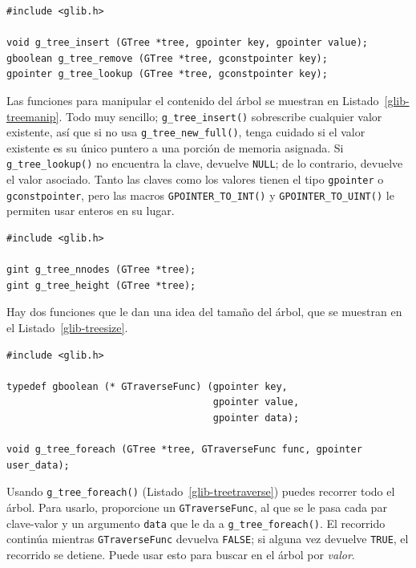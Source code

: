 \begin{lstlisting}[style=GLib/GTK, caption={Manipular el contenido de \lstinline{GTree}}, label=glib-treemanip]
#include <glib.h>

void g_tree_insert (GTree *tree, gpointer key, gpointer value);
gboolean g_tree_remove (GTree *tree, gconstpointer key);
gpointer g_tree_lookup (GTree *tree, gconstpointer key);
\end{lstlisting}

Las funciones para manipular el contenido del árbol se muestran en Listado~\ref{glib-treemanip}. Todo muy sencillo; \lstinline{g_tree_insert()} sobrescribe cualquier valor existente, así que si no usa \lstinline{g_tree_new_full()}, tenga cuidado si el valor existente es su único puntero a una porción de memoria asignada. Si \lstinline{g_tree_lookup()} no encuentra la clave, devuelve \lstinline{NULL}; de lo contrario, devuelve el valor asociado. Tanto las claves como los valores tienen el tipo \lstinline{gpointer} o \lstinline{gconstpointer}, pero las macros \lstinline{GPOINTER_TO_INT()} y \lstinline{GPOINTER_TO_UINT()} le permiten usar enteros en su lugar.

\begin{lstlisting}[style=GLib/GTK, caption={Determinar el tamaño de un \lstinline{GTree}}, label=glib-treesize]
#include <glib.h>

gint g_tree_nnodes (GTree *tree);
gint g_tree_height (GTree *tree);
\end{lstlisting}

Hay dos funciones que le dan una idea del tamaño del árbol, que se muestran en el Listado~\ref{glib-treesize}.

\begin{lstlisting}[style=GLib/GTK, caption={Atravesando un \lstinline{GTree}}, label=glib-treetraverse]
#include <glib.h>

typedef gboolean (* GTraverseFunc) (gpointer key,
                                    gpointer value,
                                    gpointer data);

void g_tree_foreach (GTree *tree, GTraverseFunc func, gpointer user_data);
\end{lstlisting}

Usando \lstinline{g_tree_foreach()} (Listado~\ref{glib-treetraverse}) puedes recorrer todo el árbol. Para usarlo, proporcione un \lstinline{GTraverseFunc}, al que se le pasa cada par clave-valor y un argumento \lstinline{data} que le da a \lstinline{g_tree_foreach()}. El recorrido continúa mientras \lstinline{GTraverseFunc} devuelva \lstinline{FALSE}; si alguna vez devuelve \lstinline{TRUE}, el recorrido se detiene. Puede usar esto para buscar en el árbol por \emph{valor}.


